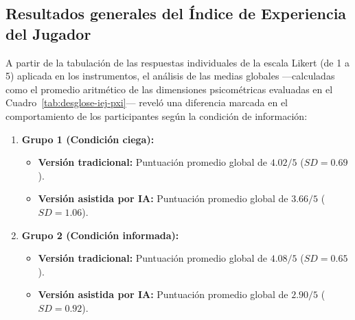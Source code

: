 \subsection{Resultados generales del Índice de Experiencia del Jugador}

A partir de la tabulación de las respuestas individuales de la escala Likert (de 1 a 5) aplicada en los instrumentos, el análisis de las medias globales ---calculadas como el promedio aritmético de las dimensiones psicométricas evaluadas en el Cuadro~\ref{tab:desglose-iej-pxi}--- reveló una diferencia marcada en el comportamiento de los participantes según la condición de información:

\begin{enumerate}
    \item \textbf{Grupo 1 (Condición ciega):}
    \begin{itemize}
        \item \textbf{Versión tradicional:} Puntuación promedio global de $4.02/5$ ($SD = 0.69$).
        \item \textbf{Versión asistida por IA:} Puntuación promedio global de $3.66/5$ ($SD = 1.06$).
    \end{itemize}
    \item \textbf{Grupo 2 (Condición informada):}
    \begin{itemize}
        \item \textbf{Versión tradicional:} Puntuación promedio global de $4.08/5$ ($SD = 0.65$).
        \item \textbf{Versión asistida por IA:} Puntuación promedio global de $2.90/5$ ($SD = 0.92$).
    \end{itemize}
\end{enumerate}

